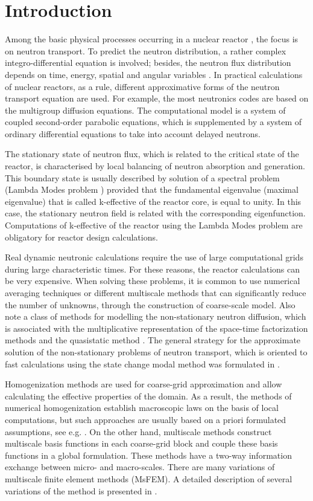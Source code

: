 \documentclass[10pt]{article}
\begin{document}
\section{Introduction}
Among the basic physical processes occurring in a nuclear reactor \cite{Duderstadt1976}, the focus is on neutron transport.
To predict the neutron distribution, a rather complex integro-differential equation is involved; besides, the neutron flux distribution depends on time, energy, spatial and angular variables \cite{Stacey2007}.
In practical calculations of nuclear reactors, as a rule,  different approximative forms of the neutron transport equation are used. For example, the most neutronics codes are based on the multigroup diffusion equations.
The computational model is a system of coupled second-order parabolic equations, which is supplemented by a system of ordinary differential equations to take into account delayed neutrons.

The stationary state of neutron flux, which is related to the critical state of the reactor, is characterised by local balancing of neutron absorption and generation.
This boundary state is usually described by solution of a spectral problem (Lambda Modes problem \cite{Verdu1994, Annals2017, Munoz2019}) provided that the fundamental eigenvalue (maximal eigenvalue) that is called k-effective of the reactor core, is equal to unity.
In this case, the stationary neutron field is related with the corresponding eigenfunction.
Computations of k-effective of the reactor using the Lambda Modes problem are obligatory for reactor design calculations.

Real dynamic neutronic calculations require the use of large computational grids during large characteristic times. For these reasons, the reactor calculations can be very expensive.
When solving these problems, it is common to use numerical averaging techniques or different multiscale methods that can significantly reduce the number of unknowns, through the construction of coarse-scale model.
Also note a class of methods for modelling the non-stationary  neutron diffusion, which is associated with the multiplicative representation of the space-time factorization methods and the quasistatic method \cite{dulla2008quasi, Carreno2019}.
The general strategy for the approximate solution of the non-stationary problems of neutron transport, which is oriented to fast calculations using the state change modal method was formulated in \cite{Progress2018}.

Homogenization methods are used for coarse-grid approximation and allow calculating the effective properties of the domain.
As a result, the methods of numerical homogenization establish macroscopic laws on the basis of local computations, but such approaches are usually based on a priori formulated assumptions, see e.g. \cite{Stalnov2017,Bakhvalov2012, Vidal2018}.
On the other hand, multiscale methods construct multiscale basis functions in each coarse-grid block and couple these basis functions in a global formulation.
These methods have a two-way information exchange between micro- and macro-scales.
There are many variations of multiscale finite element methods (MsFEM).
A detailed description of several variations of the method is presented in \cite{Efendiev2009}.
\end{document}
